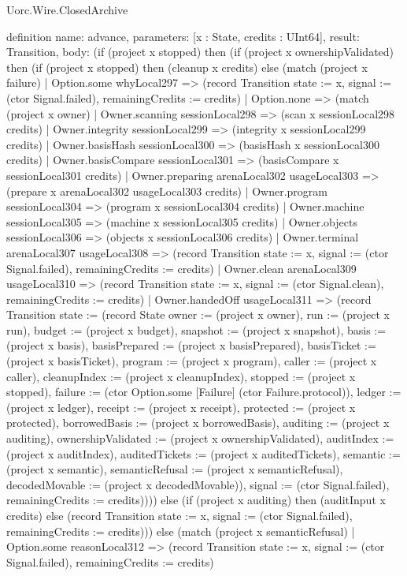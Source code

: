 \begin{lexlean}{Uorc.Wire.ClosedArchive}
\begin{semanticmodule}
definition{
  name: advance,
  parameters: [x : State, credits : UInt64],
  result: Transition,
  body: (if (project x stopped) then (if (project x ownershipValidated) then (if (project x stopped) then (cleanup x credits) else (match (project x failure)
    | Option.some whyLocal297 => (record Transition {state := x, signal := (ctor Signal.failed), remainingCredits := credits})
    | Option.none => (match (project x owner)
      | Owner.scanning sessionLocal298 => (scan x sessionLocal298 credits)
      | Owner.integrity sessionLocal299 => (integrity x sessionLocal299 credits)
      | Owner.basisHash sessionLocal300 => (basisHash x sessionLocal300 credits)
      | Owner.basisCompare sessionLocal301 => (basisCompare x sessionLocal301 credits)
      | Owner.preparing arenaLocal302 usageLocal303 => (prepare x arenaLocal302 usageLocal303 credits)
      | Owner.program sessionLocal304 => (program x sessionLocal304 credits)
      | Owner.machine sessionLocal305 => (machine x sessionLocal305 credits)
      | Owner.objects sessionLocal306 => (objects x sessionLocal306 credits)
      | Owner.terminal arenaLocal307 usageLocal308 => (record Transition {state := x, signal := (ctor Signal.failed), remainingCredits := credits})
      | Owner.clean arenaLocal309 usageLocal310 => (record Transition {state := x, signal := (ctor Signal.clean), remainingCredits := credits})
      | Owner.handedOff usageLocal311 => (record Transition {state := (record State {owner := (project x owner), run := (project x run), budget := (project x budget), snapshot := (project x snapshot), basis := (project x basis), basisPrepared := (project x basisPrepared), basisTicket := (project x basisTicket), program := (project x program), caller := (project x caller), cleanupIndex := (project x cleanupIndex), stopped := (project x stopped), failure := (ctor Option.some [Failure] (ctor Failure.protocol)), ledger := (project x ledger), receipt := (project x receipt), protected := (project x protected), borrowedBasis := (project x borrowedBasis), auditing := (project x auditing), ownershipValidated := (project x ownershipValidated), auditIndex := (project x auditIndex), auditedTickets := (project x auditedTickets), semantic := (project x semantic), semanticRefusal := (project x semanticRefusal), decodedMovable := (project x decodedMovable)}), signal := (ctor Signal.failed), remainingCredits := credits})))) else (if (project x auditing) then (auditInput x credits) else (record Transition {state := x, signal := (ctor Signal.failed), remainingCredits := credits}))) else (match (project x semanticRefusal)
    | Option.some reasonLocal312 => (record Transition {state := x, signal := (ctor Signal.failed), remainingCredits := credits})
}
\end{semanticmodule}
\end{lexlean}
